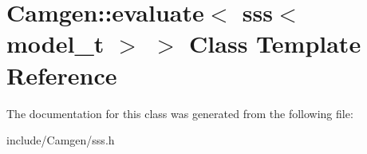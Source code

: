 \hypertarget{a00197}{}\section{Camgen\+:\+:evaluate$<$ sss$<$ model\+\_\+t $>$ $>$ Class Template Reference}
\label{a00197}


The documentation for this class was generated from the following file\+:\begin{DoxyCompactItemize}
\item 
include/\+Camgen/sss.\+h\end{DoxyCompactItemize}
